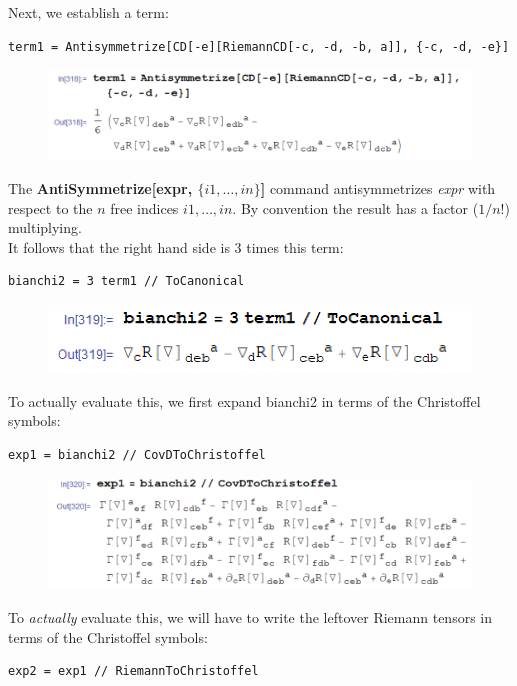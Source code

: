 \documentclass{book}
\theoremstyle{definition}
\begin{document}
Next, we establish a term:
\begin{lstlisting}
term1 = Antisymmetrize[CD[-e][RiemannCD[-c, -d, -b, a]], {-c, -d, -e}]
\end{lstlisting}
\begin{figure}[!htb]
	\includegraphics[scale=0.2]{term1}
\end{figure}
The \textbf{AntiSymmetrize[expr, $\{i1,\dots, in\}$]} command antisymmetrizes \textit{expr} with respect to the $n$ free indices $i1,\dots,in$. By convention the result has a factor ($1/n!$) multiplying.\\
It follows that the right hand side is 3 times this term:
\begin{lstlisting}
bianchi2 = 3 term1 // ToCanonical
\end{lstlisting}
\begin{figure}[!htb]
	\includegraphics[scale=0.2]{bianchi2}
\end{figure}
To actually evaluate this, we first expand bianchi2 in terms of the Christoffel symbols:
\begin{lstlisting}
exp1 = bianchi2 // CovDToChristoffel
\end{lstlisting}
\begin{figure}[!htb]
	\includegraphics[scale=0.2]{bianchi-chris}
\end{figure}
To \textit{actually} evaluate this, we will have to write the leftover Riemann tensors in terms of the Christoffel symbols:
\begin{lstlisting}
exp2 = exp1 // RiemannToChristoffel
\end{lstlisting}
\end{document}

